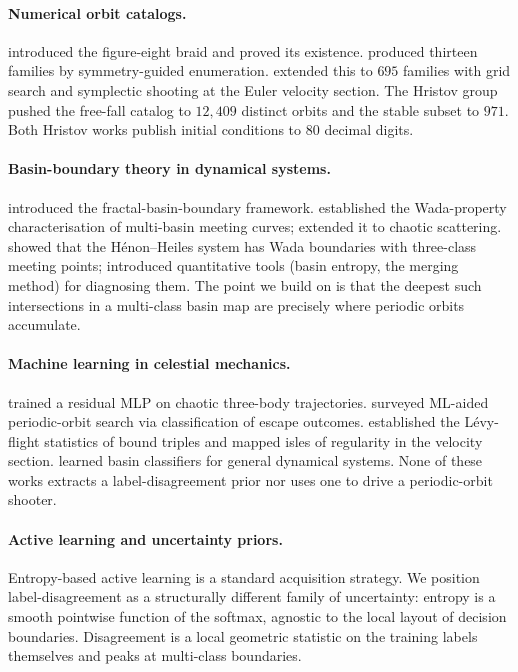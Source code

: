\documentclass[10pt]{article}
\begin{document}
\paragraph{Numerical orbit catalogs.}
\citet{Moore1993} introduced the figure-eight braid and
\citet{ChencinerMontgomery2000} proved its existence.
\citet{Suvakov2013} produced thirteen families by symmetry-guided enumeration.
\citet{LiLiao2017} extended this to $695$ families with grid search
and symplectic shooting at the Euler velocity section. The Hristov
group \citep{Hristov2024Catalog} pushed the free-fall catalog to
$12{,}409$ distinct orbits and the stable subset
\citep{Hristov2025Stable} to $971$. Both Hristov works publish initial
conditions to $80$ decimal digits.

\paragraph{Basin-boundary theory in dynamical systems.}
\citet{GOY1983, MGOY1985} introduced the fractal-basin-boundary
framework. \citet{NusseYorke1992} established the Wada-property
characterisation of multi-basin meeting curves; \citet{Poon1996}
extended it to chaotic scattering. \citet{Aguirre2001} showed that the
H{\'e}non--Heiles system has Wada boundaries with three-class meeting
points; \citet{Daza2016, Daza2018} introduced quantitative tools
(basin entropy, the merging method) for diagnosing them. The point we
build on is that the deepest such intersections in a multi-class basin
map are precisely where periodic orbits accumulate.

\paragraph{Machine learning in celestial mechanics.}
\citet{Breen2020} trained a residual MLP on chaotic three-body
trajectories. \citet{Liao2022} surveyed ML-aided periodic-orbit search
via classification of escape outcomes. \citet{Manwadkar2021}
established the L\'evy-flight statistics of bound triples and
\citet{Trani2024} mapped isles of regularity in the velocity section.
\citet{Shena2021, Valle2024} learned basin classifiers for general
dynamical systems. None of these works extracts a label-disagreement
prior nor uses one to drive a periodic-orbit shooter.

\paragraph{Active learning and uncertainty priors.}
Entropy-based active learning is a standard acquisition strategy.
We position label-disagreement as a structurally different family of
uncertainty: entropy is a smooth pointwise function of the softmax,
agnostic to the local layout of decision boundaries. Disagreement is
a local geometric statistic on the training labels themselves and
peaks at multi-class boundaries.
\end{document}
